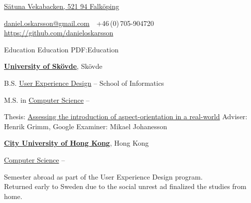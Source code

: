 \documentclass[letterpaper,MMMyyyy,nonstopmode]{resume}
\newcommand{\CVAuthor}{Daniel Oskarsson}
\newcommand{\CVWebpage}{https://github.com/danieloskarsson}
\begin{document}

\Title{\CVAuthor}

\begin{SubTitle}
\href{https://www.google.com/maps/place/VEKABACKEN,+521+94+Falk%C3%B6ping/@58.3358392,13.7009896,12z/data=!4m5!3m4!1s0x465ae469d63424bf:0xb367c493ed2f945c!8m2!3d58.2692871!4d13.5626312}
{Sätuna Vekabacken, 521 94 Falköping}
\par
\href{mailto:daniel.oskarsson@gmail.com}
{daniel.oskarsson@gmail.com}
\,\SubBulletSymbol\,
+46\,(0)\,705-904720
\\
\href{\CVWebpage}
{\url{\CVWebpage}}
\end{SubTitle}

\begin{Body}


\Section
{Education}
{Education}
{PDF:Education}

\Entry
\href{http://www.example.com/my-university}
{\textbf{University of Skövde}},
Skövde

\Gap
\BulletItem
B.S.
\href{http://www.his.se/uxd}
{User Experience Design}
\hfill
{} --
\newline
School of Informatics



\Gap
\BulletItem
M.S. in
\href{http://his.se/dvp}
{Computer Science}
\hfill
{} --
\begin{Detail}
\SubBulletItem
Thesis:
\href{http://urn.kb.se/resolve?urn=urn:nbn:se:his:diva-13461}
{Assessing the introduction of aspect-orientation in a real-world}
\SubBulletItem
Adviser:
Henrik Grimm, Google
\SubBulletItem
Examiner:
Mikael Johanesson
\end{Detail}
    
\BigGap
\Entry
\href{http://cityu.edu.hk}
{\textbf{City University of Hong Kong}}, Hong Kong

\Gap
\BulletItem
\href{https://cs.cityu.edu.hk/courses/exchange.html}
{Computer Science}
\hfill
{} --
\begin{Detail}
\SubBulletItem
Semester abroad as part of the User Experience Design program.\\Returned early to Sweden due to the social unrest ad finalized the studies from home.
\end{Detail}


\end{Body}
\end{document}
